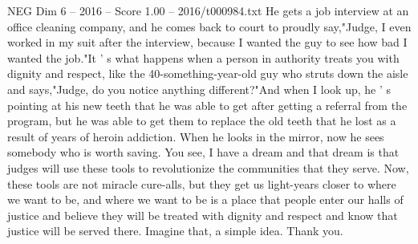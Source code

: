\begin{textsample}{NEG Dim 6 – 2016 – Score 1.00 – 2016/t000984.txt}
He gets a job interview at an office cleaning company, and he comes back to court to proudly say,"Judge, I even worked in my suit after the interview, because I wanted the guy to see how bad I wanted the job."It ' s what happens when a person in authority treats you with dignity and respect, like the 40-something-year-old guy who struts down the aisle and says,"Judge, do you notice anything different?"And when I look up, he ' s pointing at his new teeth that he was able to get after getting a referral from the program, but he was able to get them to replace the old teeth that he lost as a result of years of heroin addiction.
When he looks in the mirror, now he sees somebody who is worth saving.
You see, I have a dream and that dream is that judges will use these tools to revolutionize the communities that they serve.
Now, these tools are not miracle cure-alls, but they get us light-years closer to where we want to be, and where we want to be is a place that people enter our halls of justice and believe they will be treated with dignity and respect and know that justice will be served there.
Imagine that, a simple idea.
Thank you.

\end{textsample}
